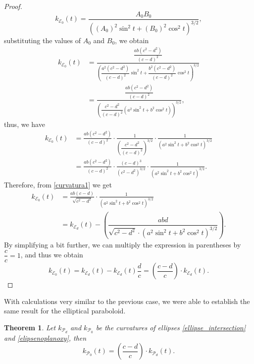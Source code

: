 \documentclass{amsart}
\theoremstyle{plain}
\newtheorem{theorem}{\bf Theorem}
\numberwithin{equation}{section}
\begin{document}
\begin{proof}
	$$
	k_{\mathcal{E}_0}(t) = \frac{A_0 B_0}{\left( (A_0)^2 \sin^2 t + (B_0)^2 \cos^2 t \right)^{3/2}},
	$$
	substituting the values of $A_0$ and $B_0$, we obtain
	\begin{align*}
		k_{\mathcal{E}_0}(t) &= \frac{\dfrac{ab(c^2 - d^2)}{(c - d)^2}}{\left( \dfrac{a^2(c^2 - d^2)}{(c - d)^2}\sin^2 t + \dfrac{b^2(c^2 - d^2)}{(c - d)^2}\cos^2 t \right)^{3/2}}\\
		&=  \frac{\dfrac{ab(c^2 - d^2)}{(c - d)^2}}{\left( \dfrac{c^2 - d^2}{(c - d)^2} (a^2 \sin^2 t + b^2 \cos^2 t) \right)^{3/2}},
	\end{align*}
	thus, we have
	\begin{align*}
		k_{\mathcal{E}_0}(t) &= \frac{ab(c^2 - d^2)}{(c - d)^2} \cdot \frac{1}{\left( \dfrac{c^2 - d^2}{(c - d)^2} \right)^{3/2}} \cdot \frac{1}{(a^2 \sin^2 t + b^2 \cos^2 t)^{3/2}}\\
		&= \frac{ab(c^2 - d^2)}{(c - d)^2} \cdot \frac{(c - d)^3}{(c^2 - d^2)^{3/2}} \cdot \frac{1}{(a^2 \sin^2 t + b^2 \cos^2 t)^{3/2}}.
	\end{align*}
	Therefore, from \eqref{curvatura1} we get 
	\begin{align*}
		k_{\mathcal{E}_0}(t) &= \frac{ab(c - d)}{\sqrt{c^2 - d^2}} \cdot \frac{1}{(a^2 \sin^2 t + b^2 \cos^2 t)^{3/2}}\\
		& = k_{\mathcal{E}_d}(t) - \left(  \dfrac{abd}{\sqrt{c^2 - d^2} \cdot (a^2 \sin^2 t + b^2 \cos^2 t)^{3/2} } \right).
	\end{align*}
	By simplifying a bit further, we can multiply the expression in parentheses by $\dfrac{c}{c} = 1$, and thus we obtain
	$$
	k_{\mathcal{E}_0}(t) = k_{\mathcal{E}_d}(t) - k_{\mathcal{E}_d}(t)\frac{d}{c} = \left(\frac{c-d}{c}\right) \cdot k_{\mathcal{E}_d}(t).
	$$
	
\end{proof}

With calculations very similar to the previous case, we were able to establish the same result for the elliptical paraboloid.

\begin{theorem}\label{teorema4}
	Let $k_{\mathcal{P}_d}$ and $k_{\mathcal{P}_0}$ be the curvatures of ellipses \eqref{ellipse_intersection} and \eqref{elipsenoplanoxy}, then
	\begin{equation}\label{conclusao curvatura paraboloide}
		k_{\mathcal{P}_0}(t) =  \left(\dfrac{c-d}{c} \right) \cdot k_{\mathcal{P}_d}(t).
	\end{equation}
\end{theorem}
\end{document}
